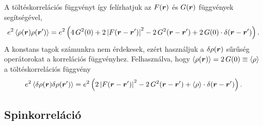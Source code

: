 \documentclass[a4paper,12pt,titlepage]{article}
\newcommand{\RR}{{\vb*{r}}}
\begin{document}
A töltéskorrelációs függvényt így felírhatjuk az $F(\RR)$ és $G(\RR)$ függvények segítségével,
\begin{equation}
	e^2 \expval{\rho(\RR) \rho(\RR^\prime)} = e^2 \left( 4 \, G^2(0) + 2 \left| F(\RR - \RR^\prime) \right|^2 - 2 \, G^2(\RR - \RR^\prime) + 2 \, G(0) \cdot \delta(\RR - \RR^\prime) \right).
\end{equation}
A konstans tagok számunkra nem érdekesek, ezért használjuk a $\delta\rho(\RR)$ sűrűség operátorokat a korrelációs függvényhez.  Felhasználva, hogy $\expval{\rho(\RR)} = 2 \, G(0) \equiv \expval{\rho}$ a töltéskorrelációs függvény
\begin{equation} \label{charge-F-G}
	e^2 \expval{\delta\rho(\RR) \delta\rho(\RR^\prime)} = e^2 \left( 2 \left| F(\RR - \RR^\prime) \right|^2 - 2 \, G^2(\RR - \RR^\prime) + \expval{\rho} \cdot \delta(\RR - \RR^\prime) \right).
\end{equation}


\subsection{Spinkorreláció}
\end{document}
